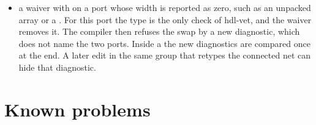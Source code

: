\begin{itemize}
  is not a difference. The comparison uses the printed form of the type and marks every type that is not
  four-state.  accepts a type difference per port, but nothing accepts
  a difference of direction or width.
\item a waiver with  on a port whose width is reported as zero, such as an
  unpacked array or a . For this port the type is the only check of hdl-vet,
  and the waiver removes it. The compiler then refuses the swap by a new diagnostic, which
  does not name the two ports. Inside a  the new diagnostics are compared once at
  the end. A later edit in the same group that retypes the connected net can hide that diagnostic.
\end{itemize}

\section{Known problems}


